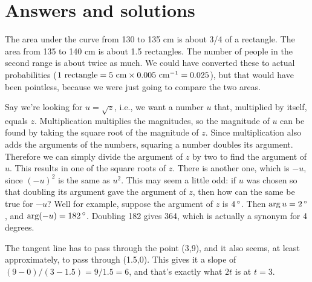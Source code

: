 \chapter{Answers and solutions}




The area under the curve from 130 to 135 cm is about 3/4 of a rectangle. The area from
135 to 140 cm is about 1.5 rectangles. The number of people in the second range is
about twice as much. We could have converted these to actual probabilities
($1\ \text{rectangle}=5\ \zu{cm}\times0.005\ \zu{cm}^{-1}=0.025$), but that would
have been pointless, because we were just going to compare the two areas.


Say we're looking for $u=\sqrt{z}$, i.e., we want a number $u$ that, multiplied by
itself, equals $z$.
Multiplication multiplies the magnitudes, so
the magnitude of $u$ can be found by taking the square root of the magnitude of $z$.
Since multiplication also adds the arguments of the numbers, squaring a number
doubles its argument. Therefore
we can simply divide the argument of $z$ by two to find the argument of
$u$. This results in one of the square roots of $z$. There is another one, which
is $-u$, since $(-u)^2$ is the same as $u^2$.
This may seem a little odd: if $u$ was chosen so that doubling its
argument gave the argument of $z$, then how can the same be true for $-u$?
Well for example, suppose the argument of $z$ is $4\,^{\circ}$. Then $\arg u=2\,^{\circ}$,
and $\arg(-u)=182\,^{\circ}$. Doubling 182 gives 364, which is actually a synonym for
4 degrees.

\vfill\pagebreak[4]




The tangent line has to pass through the point (3,9), and it also seems, at least approximately, to pass
through (1.5,0). This gives it a slope of $(9-0)/(3-1.5)=9/1.5=6$, and that's exactly what $2t$ is at $t=3$.

